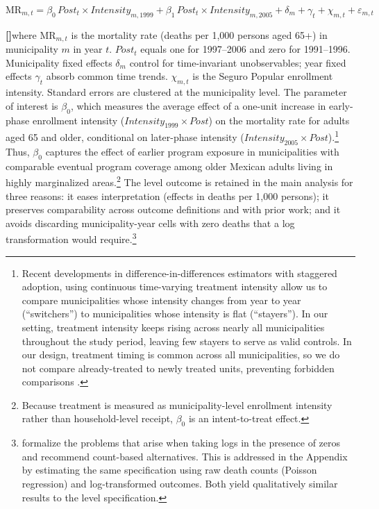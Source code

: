 \documentclass[12pt]{article}
\newcounter{paragraphnum}
\newcommand{\p}{\refstepcounter{paragraphnum}\textbf{[\theparagraphnum]}\enspace}
\begin{document}
\begin{equation}\label{eq:did}
\text{MR}_{m,t}
= \beta_{0}\,\textit{Post}_{t}\times\textit{Intensity}_{m,1999}
+ \beta_{1}\,\textit{Post}_{t}\times\textit{Intensity}_{m,2005}
+ \delta_{m} + \gamma_{t} + \chi_{m,t} + \varepsilon_{m,t}
\end{equation}

\p \noindent where $\text{MR}_{m,t}$ is the mortality rate (deaths per 1,000 persons aged 65+) in municipality $m$ in year $t$. $\textit{Post}_{t}$ equals one for 1997--2006 and zero for 1991--1996. Municipality fixed effects $\delta_{m}$ control for time-invariant unobservables; year fixed effects $\gamma_{t}$ absorb common time trends. $\chi_{m,t}$ is the Seguro Popular enrollment intensity. Standard errors are clustered at the municipality level. The parameter of interest is $\beta_0$, which measures the average effect of a one-unit increase in early-phase enrollment intensity ($\textit{Intensity}_{1999} \times \textit{Post}$) on the mortality rate for adults aged 65 and older, conditional on later-phase intensity ($\textit{Intensity}_{2005} \times \textit{Post}$).\footnote{Recent developments in difference-in-differences estimators with staggered adoption, using continuous time-varying treatment intensity \citep{deChaisemartinDHaultfoeuille2024IntertemporalDiD} allow us to compare municipalities whose intensity changes from year to year (``switchers'') to municipalities whose intensity is flat (``stayers''). In our setting, treatment intensity keeps rising across nearly all municipalities throughout the study period, leaving few stayers to serve as valid controls. In our design, treatment timing is common across all municipalities, so we do not compare already-treated to newly treated units, preventing forbidden comparisons \citep{callaway2021difference, sun2021estimating, de2020two}.} Thus, $\beta_0$ captures the effect of earlier program exposure in municipalities with comparable eventual program coverage among older Mexican adults living in highly marginalized areas.\footnote{Because treatment is measured as municipality-level enrollment intensity rather than household-level receipt, $\beta_0$ is an intent-to-treat effect.} The level outcome is retained in the main analysis for three reasons: it eases interpretation (effects in deaths per 1,000 persons); it preserves comparability across outcome definitions and with prior work; and it avoids discarding municipality-year cells with zero deaths that a log transformation would require.\footnote{\cite{ChenRoth2024QJE} formalize the problems that arise when taking logs in the presence of zeros and recommend count-based alternatives. This is addressed in the Appendix by estimating the same specification using raw death counts (Poisson regression) and log-transformed outcomes. Both yield qualitatively similar results to the level specification.}
\end{document}
